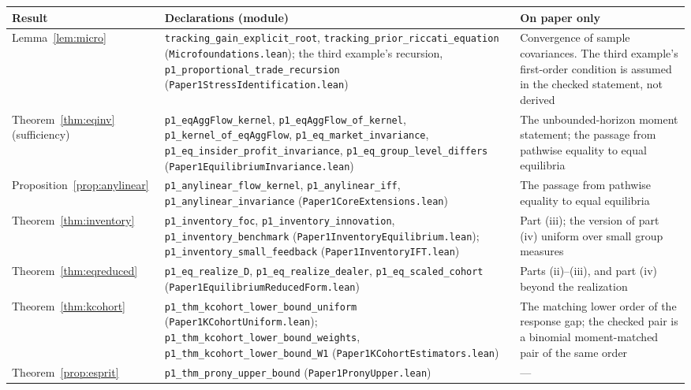 \documentclass[12pt]{article}
\theoremstyle{definition}
\theoremstyle{remark}
\begin{document}
\begin{longtable}{>{\raggedright\arraybackslash}p{}>{\raggedright\arraybackslash}p{}>{\raggedright\arraybackslash}p{}}
\toprule
Result & Declarations (module) & On paper only\\
\midrule
\endhead
Lemma~\ref{lem:micro} & \texttt{tracking\_gain\_explicit\_root}, \texttt{tracking\_prior\_riccati\_equation} (\nolinkurl{Microfoundations.lean}); the third example's recursion, \texttt{p1\_proportional\_trade\_recursion} (\nolinkurl{Paper1StressIdentification.lean}) & Convergence of sample covariances. The third example's first-order condition is assumed in the checked statement, not derived\\
Theorem~\ref{thm:eqinv} (sufficiency) & \texttt{p1\_eqAggFlow\_kernel}, \texttt{p1\_eqAggFlow\_of\_kernel}, \texttt{p1\_kernel\_of\_eqAggFlow}, \texttt{p1\_eq\_market\_invariance}, \texttt{p1\_eq\_insider\_profit\_invariance}, \texttt{p1\_eq\_group\_level\_differs} (\nolinkurl{Paper1EquilibriumInvariance.lean}) & The unbounded-horizon moment statement; the passage from pathwise equality to equal equilibria\\
Proposition~\ref{prop:anylinear} & \texttt{p1\_anylinear\_flow\_kernel}, \texttt{p1\_anylinear\_iff}, \texttt{p1\_anylinear\_invariance} (\nolinkurl{Paper1CoreExtensions.lean}) & The passage from pathwise equality to equal equilibria\\
Theorem~\ref{thm:inventory} & \texttt{p1\_inventory\_foc}, \texttt{p1\_inventory\_innovation}, \texttt{p1\_inventory\_benchmark} (\nolinkurl{Paper1InventoryEquilibrium.lean}); \texttt{p1\_inventory\_small\_feedback} (\nolinkurl{Paper1InventoryIFT.lean}) & Part (iii); the version of part (iv) uniform over small group measures\\
Theorem~\ref{thm:eqreduced} & \texttt{p1\_eq\_realize\_D}, \texttt{p1\_eq\_realize\_dealer}, \texttt{p1\_eq\_scaled\_cohort} (\nolinkurl{Paper1EquilibriumReducedForm.lean}) & Parts (ii)--(iii), and part (iv) beyond the realization\\
Theorem~\ref{thm:kcohort} & \texttt{p1\_thm\_kcohort\_lower\_bound\_uniform} (\nolinkurl{Paper1KCohortUniform.lean}); \texttt{p1\_thm\_kcohort\_lower\_bound\_weights}, \texttt{p1\_thm\_kcohort\_lower\_bound\_W1} (\nolinkurl{Paper1KCohortEstimators.lean}) & The matching lower order of the response gap; the checked pair is a binomial moment-matched pair of the same order\\
Theorem~\ref{prop:esprit} & \texttt{p1\_thm\_prony\_upper\_bound} (\nolinkurl{Paper1PronyUpper.lean}) & ---\\

\end{longtable}
\end{document}
